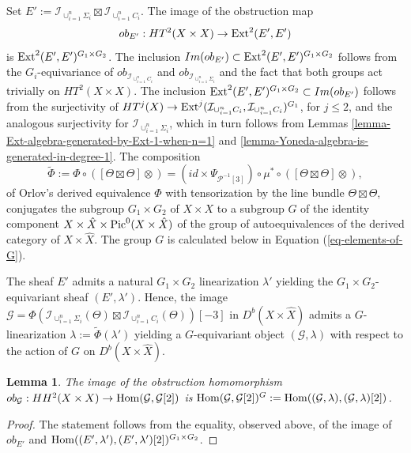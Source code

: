 \documentclass[12pt]{amsart}
\numberwithin{equation}{subsection}
\theoremstyle{plain}
\newtheorem{lem}[thm]{Lemma}
\theoremstyle{definition}
\newcommand{\G}{{\mathcal G}}
\renewcommand{\P}{{\mathcal P}}
\newcommand{\Pic}{{\rm Pic}}
\newcommand{\Ext}{{\rm Ext}}
\newcommand{\Hom}{{\rm Hom}}
\newcommand{\Ideal}[1]{{\mathcal I}_{#1}}
\begin{document}
Set $E':=\Ideal{\cup_{i=1}^n\Sigma_i}\boxtimes \Ideal{\cup_{i=1}^n C_i}$.
The image of the obstruction map
\[
ob_{E'}:HT^2(X\times X)\rightarrow \Ext^2(E',E')
\]
is $\Ext^2(E',E')^{G_1\times G_2}$. The inclusion $Im(ob_{E'})\subset \Ext^2(E',E')^{G_1\times G_2}$
follows from the $G_i$-equivariance of $ob_{\Ideal{\cup_{i=1}^n C_i}}$ and $ob_{\Ideal{\cup_{i=1}^n \Sigma_i}}$ and the fact that both groups act trivially on $HT^2(X\times X)$.
The inclusion $\Ext^2(E',E')^{G_1\times G_2}\subset Im(ob_{E'})$ follows from the surjectivity of 
$HT^j(X)\rightarrow \Ext^j(\Ideal{\cup_{i=1}^n C_i},\Ideal{\cup_{i=1}^n C_i})^{G_1}$, for $j\leq 2$, and the analogous surjectivity for 
$\Ideal{\cup_{i=1}^n \Sigma_i}$, which in turn follows from Lemmas \ref{lemma-Ext-algebra-generated-by-Ext-1-when-n=1} and  \ref{lemma-Yoneda-algebra-is-generated-in-degree-1}.
The composition 
\[
\tilde{\Phi}:=\Phi\circ ([\Theta\boxtimes\Theta]\otimes)=(id\times \Psi_{\P^{-1}[3]})\circ\mu^*\circ([\Theta\boxtimes\Theta]\otimes),
\] 
of 
Orlov's derived equivalence $\Phi$ with tensorization by the line bundle $\Theta\boxtimes\Theta$, conjugates the subgroup $G_1\times G_2$ of $X\times X$ to a subgroup $G$ of the identity component 
$X\times\hat{X}\times \Pic^0(X\times\hat{X})$
of the group of autoequivalences of the derived category of $X\times\hat{X}$. The group $G$ is calculated below in Equation (\ref{eq-elements-of-G}).

The sheaf $E'$ admits a natural $G_1\times G_2$ linearization $\lambda'$ yielding the $G_1\times G_2$-equivariant sheaf $(E',\lambda')$. Hence, 
the image $\G=\Phi(\Ideal{\cup_{i=1}^n\Sigma_i}(\Theta)\boxtimes \Ideal{\cup_{i=1}^n C_i}(\Theta))[-3]$ in $D^b(X\times \hat{X})$ admits a $G$-linearization $\lambda:=\tilde{\Phi}(\lambda')$ yielding a $G$-equivariant object $(\G,\lambda)$ with respect to the action of $G$ on $D^b(X\times \hat{X})$. 

\begin{lem}
\label{lemma-image-of-ob-E-is-the-G-invariant-subspace}
The image of the obstruction homomorphism $ob_\G:HH^2(X\times X)\rightarrow \Hom(\G,\G[2])$ is 
$\Hom(\G,\G[2])^G:=\Hom((\G,\lambda),(\G,\lambda)[2])$. 
\end{lem}

\begin{proof}
The statement follows from the equality, observed above, of the image of $ob_{E'}$ and $\Hom((E',\lambda'),(E',\lambda')[2])^{G_1\times G_2}$.
\end{proof}
\end{document}
